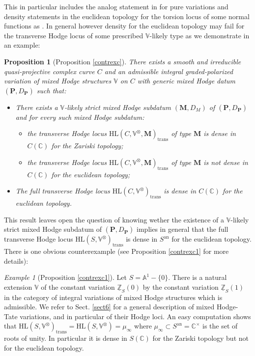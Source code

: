 \documentclass[10pt]{article}
\numberwithin{equation}{subsection}
\theoremstyle{plain}
\newtheorem{proposition}[theorem]{Proposition}
\theoremstyle{definition}
\theoremstyle{remark}
\newtheorem{example}[theorem]{Example}
\newcommand{\Z}{\mathbb Z}
\newcommand{\C}{\mathbb C}
\newcommand{\V}{\mathbb V}
\newcommand{\pp}{\mathbf P}
\newcommand{\M}{\mathbf M}
\newcommand{\HL}{\mathrm{HL}(S, \V^\otimes)}
\newcommand{\an}{\mathrm{an}}
\newcommand{\trans}{\mathrm{trans}}
\begin{document}
This in particular includes the analog statement in \cite{ku, es} for pure variations and density statements in the euclidean topology for the torsion locus of some normal functions as \cite[Thm. 1.5]{ketay}. In general however density for the euclidean topology may fail for the transverse Hodge locus of some prescribed $\V$-likely type as we demonstrate in an example:
\begin{proposition}[Proposition \ref{contrexc}]\label{pr1}
There exists a smooth and irreducible quasi-projective complex curve $C$ and an admissible integral graded-polarized variation of mixed Hodge structures $\V$ on $C$ with generic mixed Hodge datum $(\pp,D_\pp)$ such that:
\begin{itemize}
 \item[(i)] There exists a $\V$-likely strict mixed Hodge subdatum $(\M,D_M)$ of $(\pp, D_\pp)$ and for every such mixed Hodge subdatum:
\begin{itemize}
\item[($i_1)$] the transverse Hodge locus $\mathrm{HL}(C, \V^\otimes, \M)_\trans$ of type $\M$ is dense in $C(\C)$ for the Zariski topology;
\item[$(i_2)$] the transverse Hodge locus $\mathrm{HL}(C, \V^\otimes, \M)_\trans$ of type $\M$ is not dense in $C(\C)$ for the euclidean topology;
\end{itemize}
\item[(ii)] The full transverse Hodge locus $\mathrm{HL}(C, \V^\otimes)_\trans$ is dense in $C(\C)$ for the euclidean topology.
\end{itemize}
\end{proposition}
This result leaves open the question of knowing wether the existence of a $\V$-likely strict mixed Hodge subdatum of $(\pp, D_\pp)$ implies in general that the full transverse Hodge locus $\HL_\trans$ is dense in $S^\an$ for the euclidean topology. There is one obvious counterexample (see Proposition \ref{contrexc1} for more details):
\begin{example}[Proposition \ref{contrexc1}]\label{ex1}
Let $S = \mathbb{A}^1 - \{0\}$. There is a natural extension $\V$ of the constant variation $\underline{\Z}_S(0)$ by the constant variation $\underline{\Z}_S(1)$ in the category of integral variations of mixed Hodge structures which is admissible. We refer to Sect. \ref{sect6} for a general description of mixed Hodge-Tate variations, and in particular of their Hodge loci. An easy computation shows that $\HL_\trans = \HL = \mu_{\infty}$ where $\mu_{\infty} \subset S^\an = \C^\times$ is the set of roots of unity. In particular it is dense in $S(\C)$ for the Zariski topology but not for the euclidean topology.
\end{example}
\end{document}
